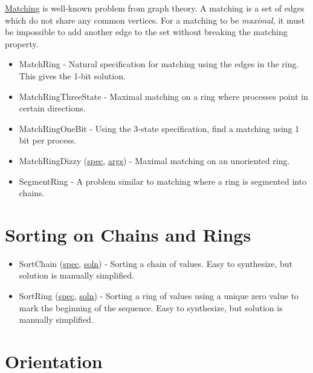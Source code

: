 \href{http://en.wikipedia.org/wiki/Matching_(graph_theory)}{Matching} is well-known problem from graph theory.
A matching is a set of edges which do not share any common vertices.
For a matching to be \textit{maximal}, it must be impossible to add another edge to the set without breaking the matching property.
\begin{itemize}
\item MatchRing \href{Matching.html#sec:MatchRing}{\LinkText}
- Natural specification for matching using the edges in the ring.
This gives the 1-bit solution.
\item MatchRingThreeState \href{Matching.html#sec:MatchRingThreeState}{\LinkText}
- Maximal matching on a ring where processes point in certain directions.
\item MatchRingOneBit \href{Matching.html#sec:MatchRingOneBit}{\LinkText}
- Using the 3-state specification, find a matching using 1 bit per process.
\item MatchRingDizzy (\href{\examplespec/MatchRingDizzy.prot}{spec}, \href{\examplesett/MatchRingDizzy.args}{args})
- Maximal matching on an unoriented ring.
\item SegmentRing \href{Matching.html#sec:SegmentRing}{\LinkText}
- A problem similar to matching where a ring is segmented into chains.
\end{itemize}

\section{Sorting on Chains and Rings}

\begin{itemize}
\item SortChain (\href{\examplespec/SortChain.prot}{spec}, \href{\examplesoln/SortChain.prot}{soln})
- Sorting a chain of values.
Easy to synthesize, but solution is manually simplified.
\item SortRing (\href{\examplespec/SortRing.prot}{spec}, \href{\examplesoln/SortRing.prot}{soln})
- Sorting a ring of values using a unique zero value to mark the beginning of the sequence.
Easy to synthesize, but solution is manually simplified.
\end{itemize}

\section{Orientation}


